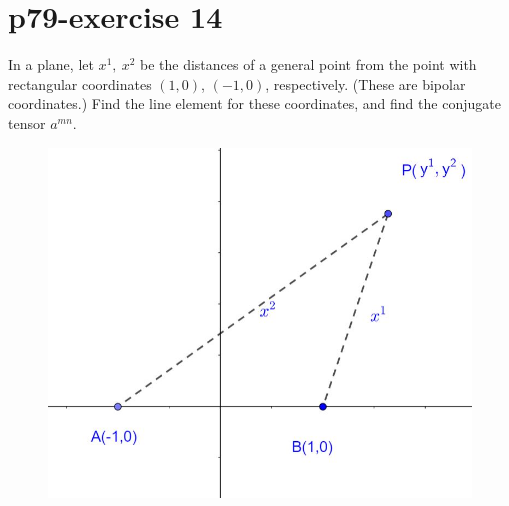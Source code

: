 \section{p79-exercise 14}
\begin{tcolorbox}
In a plane, let $x^1, \  x^2$ be the distances of a general point from the point with rectangular coordinates $(1,0)$, $(-1,0)$, respectively. (These are bipolar coordinates.) Find the line element for these coordinates, and find the conjugate tensor $a^{mn}$.
\end{tcolorbox}
\begin{figure}[h]
\centering
\begin{minipage}[t]{.5\textwidth}
\vspace{0pt}
\includegraphics[scale=.4]{Bipolar.jpg}
\end{minipage}\hfill
\end{figure}
